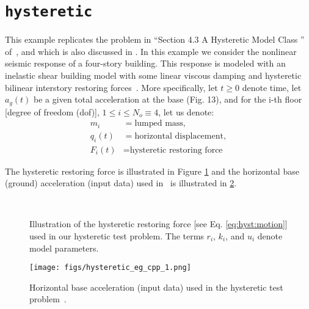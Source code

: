 \section{\texttt{hysteretic}}\label{sec:example_hysteretic}

This example replicates the problem in ``Section 4.3 A Hysteretic Model Class
'' of~\cite{CheungPrudencio2012}, and which is also discussed in \cite{Cheung_2009A}.
In this example we consider the nonlinear seismic response of a four-story building.
This response is modeled with
an inelastic shear building model with some linear viscous damping and hysteretic bilinear interstory restoring forces~\cite{Cheung_2009A}. More
specifically, let $t\geq0 $ denote time, let $a_g(t)$ be a given total acceleration at the base (Fig. 13), and for the i-th floor [degree of freedom (dof)], $1 \leq i \leq N_o \equiv 4$, let us denote:
\begin{equation}
\begin{split}
m_i &= \text{lumped mass},\\
q_i(t) &= \text{horizontal displacement},\\
F_i(t) &= \text{hysteretic restoring force}
\end{split}
\end{equation}

The hysteretic restoring force is illustrated in Figure \ref{fig:hyst_rest_force} and the horizontal base (ground) acceleration (input data) used in~\cite{CheungPrudencio2012} is illustrated in \ref{hig:hist_base_acceleration}.
\begin{figure}[h!]
\centerline{
\\
}
\caption{Illustration of the hysteretic restoring force [see Eq. \eqref{eq:hyst:motion}] used in our hysteretic test problem. The terms $r_i$, $k_i$, and $u_i$ denote model parameters.}
\label{fig:hyst_rest_force}
\end{figure}
%
\begin{figure}[hptb]
\centering
\texttt{[image: figs/hysteretic\_eg\_cpp\_1.png]}
\vspace{-8pt}
\caption{Horizontal base acceleration (input data) used in the hysteretic test problem~\cite{CheungPrudencio2012}.}
\label{hig:hist_base_acceleration}
\end{figure}

